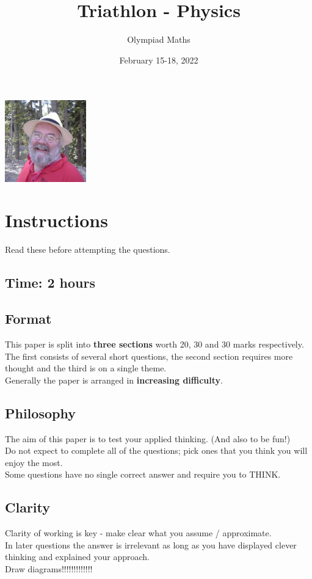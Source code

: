 \documentclass{exam}
\title{Triathlon - Physics}
\author{Olympiad Maths}
\date{February 15-18, 2022}
\begin{document}
\large
\maketitle

\begin{center}
    \vspace{-10pt}
    \includegraphics[height=100pt]{geoffsmith}
    \vspace{-10pt}
\end{center}

\section* {Instructions}

Read these before attempting the questions.

\subsection*{Time: 2 hours}

\subsection*{Format}
This paper is split into \textbf{three sections} worth 20, 30 and 30 marks respectively.\\
The first consists of several short questions, the second section requires more thought and the third is on a single theme.\\
Generally the paper is arranged in \textbf{increasing difficulty}.

\subsection*{Philosophy}
The aim of this paper is to test your applied thinking. (And also to be fun!)\\
Do not expect to complete all of the questions; pick ones that you think you will enjoy the most.\\
Some questions have no single correct answer and require you to THINK.

\subsection*{Clarity}
Clarity of working is key - make clear what you assume / approximate.\\
In later questions the answer is irrelevant as long as you have displayed clever thinking and explained your approach.\\
Draw diagrams!!!!!!!!!!!!!
\end{document}
